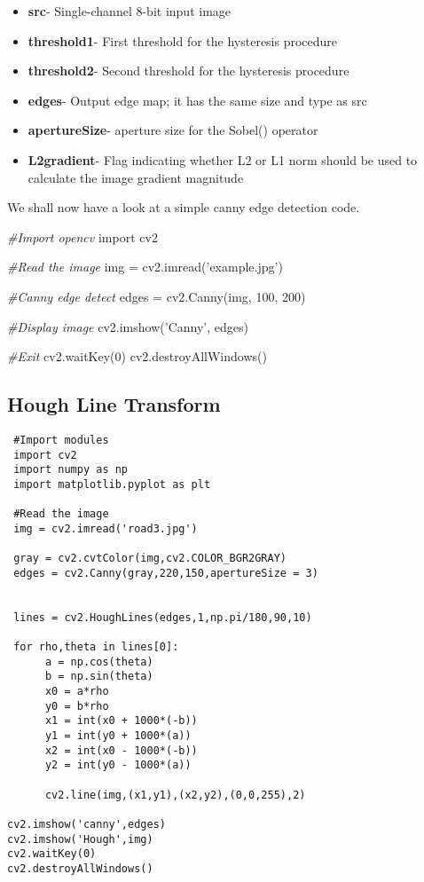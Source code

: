 \documentclass[]{article}
\newenvironment{Shaded}{}{}
\newcommand{\DecValTok}[1]{\textcolor[rgb]{0.25,0.63,0.44}{{#1}}}
\newcommand{\StringTok}[1]{\textcolor[rgb]{0.25,0.44,0.63}{{#1}}}
\newcommand{\ImportTok}[1]{{#1}}
\newcommand{\CommentTok}[1]{\textcolor[rgb]{0.38,0.63,0.69}{\textit{{#1}}}}
\newcommand{\OperatorTok}[1]{\textcolor[rgb]{0.40,0.40,0.40}{{#1}}}
\newcommand{\NormalTok}[1]{{#1}}
\providecommand{\tightlist}{%
  \setlength{\itemsep}{0pt}\setlength{\parskip}{0pt}}
\begin{document}
\begin{itemize}
\tightlist
\item
  \textbf{src}- Single-channel 8-bit input image
\item
  \textbf{threshold1}- First threshold for the hysteresis procedure
\item
  \textbf{threshold2}- Second threshold for the hysteresis procedure
\item
  \textbf{edges}- Output edge map; it has the same size and type as src
\item
  \textbf{apertureSize}- aperture size for the Sobel() operator
\item
  \textbf{L2gradient}- Flag indicating whether L2 or L1 norm should be
  used to calculate the image gradient magnitude
\end{itemize}

We shall now have a look at a simple canny edge detection code.

\begin{Shaded}
\begin{Highlighting}[]
\CommentTok{#Import opencv}
\ImportTok{import} \NormalTok{cv2}

\CommentTok{#Read the image}
\NormalTok{img }\OperatorTok{=} \NormalTok{cv2.imread(}\StringTok{'example.jpg'}\NormalTok{)}

\CommentTok{#Canny edge detect}
\NormalTok{edges }\OperatorTok{=} \NormalTok{cv2.Canny(img, }\DecValTok{100}\NormalTok{, }\DecValTok{200}\NormalTok{)}

\CommentTok{#Display image}
\NormalTok{cv2.imshow(}\StringTok{'Canny'}\NormalTok{, edges)}

\CommentTok{#Exit}
\NormalTok{cv2.waitKey(}\DecValTok{0}\NormalTok{)}
\NormalTok{cv2.destroyAllWindows()}
\end{Highlighting}
\end{Shaded}

\newpage
\subsection{Hough Line Transform}\label{hough-line-transform}

\begin{verbatim}
 #Import modules 
 import cv2   
 import numpy as np
 import matplotlib.pyplot as plt

 #Read the image   
 img = cv2.imread('road3.jpg')

 gray = cv2.cvtColor(img,cv2.COLOR_BGR2GRAY)
 edges = cv2.Canny(gray,220,150,apertureSize = 3)


 lines = cv2.HoughLines(edges,1,np.pi/180,90,10)

 for rho,theta in lines[0]:
      a = np.cos(theta)
      b = np.sin(theta)
      x0 = a*rho
      y0 = b*rho
      x1 = int(x0 + 1000*(-b))
      y1 = int(y0 + 1000*(a))
      x2 = int(x0 - 1000*(-b))
      y2 = int(y0 - 1000*(a))

      cv2.line(img,(x1,y1),(x2,y2),(0,0,255),2)

cv2.imshow('canny',edges)
cv2.imshow('Hough',img)
cv2.waitKey(0)
cv2.destroyAllWindows()
\end{verbatim}
\end{document}
